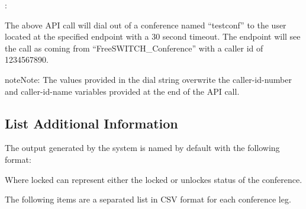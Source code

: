 \documentclass[letterpaper,10pt,english]{sphinxmanual}
\begin{document}
:

\begin{sphinxVerbatim}[commandchars=\\\{\}]
     
\end{sphinxVerbatim}

The above API call will dial out of a conference named “testconf” to the user located at the specified endpoint with a 30 second timeout. The endpoint will see the call as coming from “FreeSWITCH\_Conference” with a caller id of 1234567890.

\begin{sphinxadmonition}{note}{Note:}
The values provided in the dial string overwrite the caller-id-number and caller-id-name variables provided at the end of the API call.
\end{sphinxadmonition}


\subsection{List Additional Information}
\label{\detokenize{restapi:list-additional-information}}
The output generated by the system is named by default with the following format:

\begin{sphinxVerbatim}[commandchars=\\\{\}]
   \PYG{p}{[}\PYG{p}{]}\PYG{p}{[}\PYG{p}{]}
\end{sphinxVerbatim}

Where locked can represent either the locked or unlockes status of the conference.

The following items are a separated list in CSV format for each conference leg.
\end{document}
